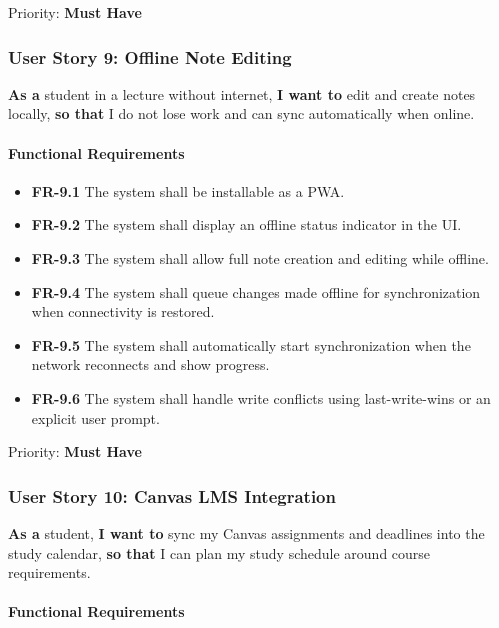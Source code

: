 \documentclass[12pt,a4paper]{article}
\begin{document}
Priority: \textbf{Must Have}

\subsubsection{User Story 9: Offline Note Editing}

\textbf{As a} student in a lecture without internet, \textbf{I want to} edit and create notes locally, \textbf{so that} I do not lose work and can sync automatically when online.

\paragraph{Functional Requirements}

\begin{itemize}
    \item \textbf{FR-9.1} The system shall be installable as a PWA.
    \item \textbf{FR-9.2} The system shall display an offline status indicator in the UI.
    \item \textbf{FR-9.3} The system shall allow full note creation and editing while offline.
    \item \textbf{FR-9.4} The system shall queue changes made offline for synchronization when connectivity is restored.
    \item \textbf{FR-9.5} The system shall automatically start synchronization when the network reconnects and show progress.
    \item \textbf{FR-9.6} The system shall handle write conflicts using last-write-wins or an explicit user prompt.
\end{itemize}

Priority: \textbf{Must Have}

\subsubsection{User Story 10: Canvas LMS Integration}

\textbf{As a} student, \textbf{I want to} sync my Canvas assignments and deadlines into the study calendar, \textbf{so that} I can plan my study schedule around course requirements.

\paragraph{Functional Requirements}
\end{document}
